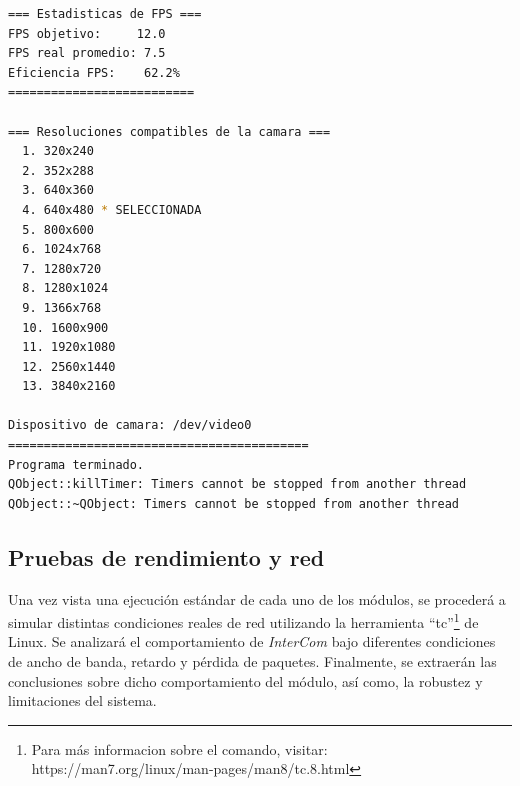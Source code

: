 \begin{lstlisting}[language=bash,basicstyle=\ttfamily\scriptsize]
=== Estadisticas de FPS ===
FPS objetivo:     12.0
FPS real promedio: 7.5
Eficiencia FPS:    62.2%
==========================

=== Resoluciones compatibles de la camara ===
  1. 320x240
  2. 352x288
  3. 640x360
  4. 640x480 * SELECCIONADA
  5. 800x600
  6. 1024x768
  7. 1280x720
  8. 1280x1024
  9. 1366x768
  10. 1600x900
  11. 1920x1080
  12. 2560x1440
  13. 3840x2160

Dispositivo de camara: /dev/video0
==========================================
Programa terminado.
QObject::killTimer: Timers cannot be stopped from another thread
QObject::~QObject: Timers cannot be stopped from another thread
\end{lstlisting}
\vspace{\baselineskip}

\newpage
\subsection{Pruebas de rendimiento y red}

Una vez vista una ejecución estándar de cada uno de los módulos, se procederá a simular distintas condiciones reales de red utilizando la herramienta ``tc''\footnote{Para más informacion sobre el comando, visitar: https://man7.org/linux/man-pages/man8/tc.8.html} de Linux. Se analizará el comportamiento de \textit{InterCom} bajo diferentes condiciones de ancho de banda, retardo y pérdida de paquetes. Finalmente, se extraerán las conclusiones sobre dicho comportamiento del módulo, así como, la robustez y limitaciones del sistema.
\vspace{\baselineskip}

